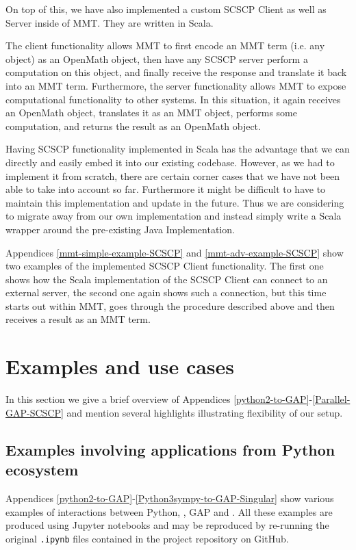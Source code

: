 \documentclass{deliverablereport}
\begin{document}
On top of this, we have also implemented a custom SCSCP Client as well as Server inside of MMT.
They are written in Scala.

The client functionality allows MMT to first encode an MMT term
(i.e. any object) as an OpenMath object, then have any SCSCP server
perform a computation on this object, and finally receive the response
and translate it back into an MMT term.  Furthermore, the server
functionality allows MMT to expose computational functionality to other
systems.  In this situation, it again receives an OpenMath object,
translates it as an MMT object, performs some computation, and returns
the result as an OpenMath object.

Having SCSCP functionality implemented in Scala has the advantage
that we can directly and easily embed it into our existing codebase.
However, as we had to implement it from scratch, there are certain
corner cases that we have not been able to take into account so far.
Furthermore it might be difficult to have to maintain this
implementation and update in the future.  Thus we are considering to
migrate away from our own implementation and instead simply write a
Scala wrapper around the pre-existing Java Implementation.

Appendices \ref{mmt-simple-example-SCSCP} and \ref{mmt-adv-example-SCSCP} 
show two examples of the implemented SCSCP Client functionality. The first 
one shows how the Scala implementation of the SCSCP Client can connect to an 
external server, the second one again shows such a connection, but this time
starts out within MMT, goes through the procedure described above and then 
receives a result as an MMT term. 

\section{Examples and use cases}\label{examples}

In this section we give a brief overview of 
Appendices \ref{python2-to-GAP}-\ref{Parallel-GAP-SCSCP}
and mention several highlights illustrating flexibility of our setup.

\subsection{Examples involving applications from Python ecosystem}

Appendices \ref{python2-to-GAP}-\ref{Python3sympy-to-GAP-Singular}
show various examples of interactions between Python, \Sage, GAP 
and \Singular. All these examples are produced using Jupyter notebooks
and may be reproduced by re-running the original {\tt .ipynb} files
contained in the project repository on GitHub.
\end{document}
